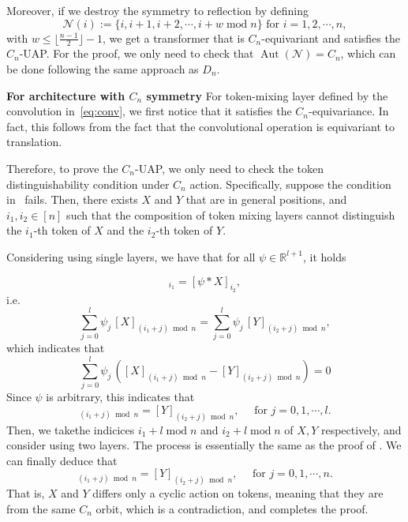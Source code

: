 \documentclass{article}
\begin{document}
Moreover, if we destroy the symmetry to reflection by defining 
\begin{equation}
    \mathcal N(i):=\{i, i+1,i+2,\cdots, i+w \operatorname{mod} n\}\text{ for } i=1,2,\cdots, n,
\end{equation}
with $w\le\lfloor \frac{n-1}{2}\rfloor-1$, we get a transformer that is $C_n$-equivariant and satisfies the $C_n$-UAP. For the proof, we only need to check that $\operatorname{Aut}(\mathcal N)=C_n $, which can be done following the same approach as $D_n$.

\textbf{For architecture with $C_n$ symmetry}
For token-mixing layer defined by the convolution in~\eqref{eq:conv}, we first notice that it satisfies the $C_n$-equivariance. In fact, this follows from the fact that the convolutional operation is equivariant to translation.

Therefore, to prove the $C_n$-UAP, we only need to check the token distinguishability condition under $C_n$ action. Specifically, suppose the condition in~ fails. Then, there exists $X$ and $Y$ that are in general positions, and $i_1,i_2\in [n]$ such that the composition of token mixing layers cannot distinguish the $i_1$-th token of $X$ and the $i_2$-th token of $Y$. 

Considering using single layers, we have that for all $\psi\in\mathbb R^{l+1}$, it holds

\begin{equation}
    [\psi * X]_{i_1} = [\psi * X]_{i_2},
\end{equation}
i.e. 
\begin{equation}
    \sum_{j=0}^{l} \psi_{j}\, [X]_{(i_1 + j) \bmod n}=\sum_{j=0}^{l} \psi_{j}\, [Y]_{(i_2 + j) \bmod n},
\end{equation}
which indicates that
\begin{equation}
    \sum_{j=0}^{l} \psi_{j}\, ([X]_{(i_1 + j) \bmod n}-[Y]_{(i_2 + j) \bmod n})=0
\end{equation}
Since $\psi$ is arbitrary, this indicates that
\begin{equation}
    [X]_{(i_1 + j) \bmod n}=[Y]_{(i_2 + j) \bmod n}, \quad \text{ for } j=0,1,\cdots, l.
\end{equation}
Then, we takethe indicices ${i_1+ l\operatorname{mod} n}$ and ${i_2+ l\operatorname{mod} n}$ of $X, Y$ respectively, and consider using two layers. The process is essentially the same as the proof of . We can finally deduce that 
\begin{equation}
    [X]_{(i_1 + j) \bmod n}=[Y]_{(i_2 + j) \bmod n}, \quad \text{ for } j=0,1,\cdots, n.
\end{equation}
That is, $X$ and $Y$ differs only a cyclic action on tokens, meaning that they are from the same $C_n$ orbit, which is a contradiction, and completes the proof.
\end{document}
